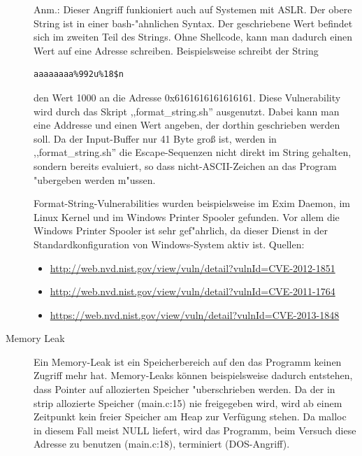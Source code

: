 \documentclass[12pt,a4paper,titlepage,oneside]{scrartcl}
\begin{document}
\begin{description}
\begin{itemize}
\begin{lstlisting}
        \end{lstlisting}
    \end{itemize}
    Anm.: Dieser Angriff funkioniert auch auf Systemen mit ASLR. Der obere String ist in einer bash-"ahnlichen Syntax.\newline
    Der geschriebene Wert befindet sich im zweiten Teil des Strings. Ohne Shellcode, kann man dadurch einen Wert auf eine Adresse schreiben.\newline
    Beispielsweise schreibt der String
    \begin{lstlisting}
aaaaaaaa%992u%18$n
	 \end{lstlisting}
	 den Wert 1000 an die Adresse 0x6161616161616161.\newline
    Diese Vulnerability wird durch das Skript ,,format\_string.sh'' ausgenutzt. Dabei kann man eine Addresse und einen Wert angeben, der dorthin geschrieben werden soll.\newline
    Da der Input-Buffer nur 41 Byte groß ist, werden in ,,format\_string.sh'' die Escape-Sequenzen nicht direkt im String gehalten, sondern bereits evaluiert, so dass nicht-ASCII-Zeichen an das Program "ubergeben werden m"ussen.
    
    Format-String-Vulnerabilities wurden beispielsweise im Exim Daemon, im Linux Kernel und im Windows Printer Spooler gefunden. Vor allem die Windows Printer Spooler ist sehr gef"ahrlich, da dieser Dienst in der Standardkonfiguration von Windows-System aktiv ist.
    Quellen:
    \begin{itemize}
    \item \url{http://web.nvd.nist.gov/view/vuln/detail?vulnId=CVE-2012-1851}
    \item \url{http://web.nvd.nist.gov/view/vuln/detail?vulnId=CVE-2011-1764}
    \item \url{https://web.nvd.nist.gov/view/vuln/detail?vulnId=CVE-2013-1848}
\end{itemize}
    \item[Memory Leak]
    Ein Memory-Leak ist ein Speicherbereich auf den das Programm keinen Zugriff mehr hat. Memory-Leaks können beispielsweise dadurch entstehen, dass Pointer auf allozierten Speicher "uberschrieben werden.
    Da der in strip allozierte Speicher (main.c:15) nie freigegeben wird, wird ab einem Zeitpunkt kein freier Speicher am Heap zur Verfügung stehen. Da malloc in diesem Fall meist NULL liefert, wird das Programm, beim Versuch diese Adresse zu benutzen (main.c:18), terminiert (DOS-Angriff).\newline
    

\end{description}
\end{document}

